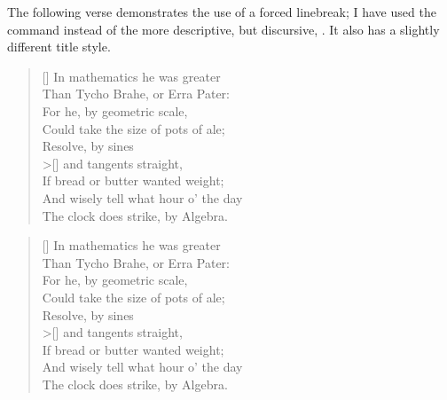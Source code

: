 The following verse demonstrates the use of a forced 
linebreak; I have
used the \cmd{\\>} command instead of the more descriptive,
but discursive, \cmd{\verselinebreak}. It also
has a slightly different title style.
\begin{lcode}
\renewcommand{\PoemTitlefont}{%
              \normalfont\large\itshape\centering}
\settowidth{\versewidth}{Than Tycho Brahe, or Erra Pater:}
\begin{verse}[\versewidth]
In mathematics he was greater \\
Than Tycho Brahe, or Erra Pater: \\
For he, by geometric scale, \\
Could take the size of pots of ale;\\ 
\settowidth{\versewidth}{Resolve by}%
Resolve, by sines \\>[\versewidth] and tangents straight, \\
If bread or butter wanted weight; \\
And wisely tell what hour o' the day \\
The clock does strike, by Algebra.
\end{verse}
\end{lcode}


\renewcommand{\PoemTitlefont}{\normalfont\large\itshape\centering}
\settowidth{\versewidth}{Than Tycho Brahe, or Erra Pater:}
\begin{verse}[\versewidth]
In mathematics he was greater \\
Than Tycho Brahe, or Erra Pater: \\
For he, by geometric scale, \\
Could take the size of pots of ale;\\ 
\settowidth{\versewidth}{Resolve by}%
Resolve, by sines \\>[\versewidth] and tangents straight, \\
If bread or butter wanted weight; \\
And wisely tell what hour o' the day \\
The clock does strike, by Algebra.
\end{verse}

\vspace{\onelineskip}

